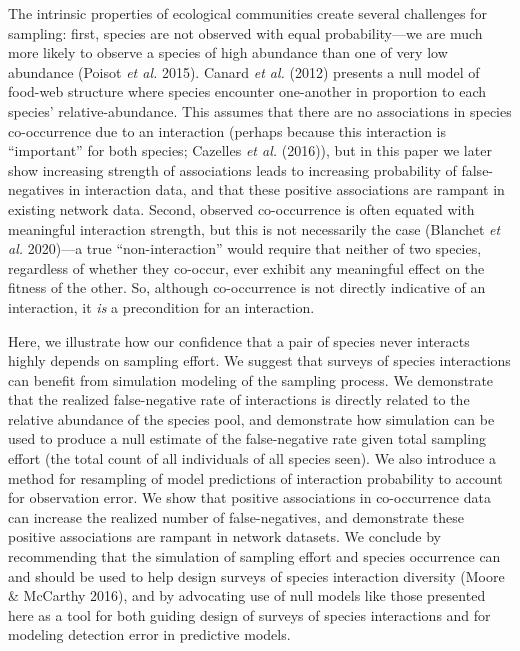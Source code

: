 \documentclass[11pt]{article}
\begin{document}
The intrinsic properties of ecological communities create several
challenges for sampling: first, species are not observed with equal
probability---we are much more likely to observe a species of high
abundance than one of very low abundance (Poisot \emph{et al.} 2015).
Canard \emph{et al.} (2012) presents a null model of food-web structure
where species encounter one-another in proportion to each species'
relative-abundance. This assumes that there are no associations in
species co-occurrence due to an interaction (perhaps because this
interaction is ``important'' for both species; Cazelles \emph{et al.}
(2016)), but in this paper we later show increasing strength of
associations leads to increasing probability of false-negatives in
interaction data, and that these positive associations are rampant in
existing network data. Second, observed co-occurrence is often equated
with meaningful interaction strength, but this is not necessarily the
case (Blanchet \emph{et al.} 2020)---a true ``non-interaction'' would
require that neither of two species, regardless of whether they
co-occur, ever exhibit any meaningful effect on the fitness of the
other. So, although co-occurrence is not directly indicative of an
interaction, it \emph{is} a precondition for an interaction.

Here, we illustrate how our confidence that a pair of species never
interacts highly depends on sampling effort. We suggest that surveys of
species interactions can benefit from simulation modeling of the
sampling process. We demonstrate that the realized false-negative rate
of interactions is directly related to the relative abundance of the
species pool, and demonstrate how simulation can be used to produce a
null estimate of the false-negative rate given total sampling effort
(the total count of all individuals of all species seen). We also
introduce a method for resampling of model predictions of interaction
probability to account for observation error. We show that positive
associations in co-occurrence data can increase the realized number of
false-negatives, and demonstrate these positive associations are rampant
in network datasets. We conclude by recommending that the simulation of
sampling effort and species occurrence can and should be used to help
design surveys of species interaction diversity (Moore \& McCarthy
2016), and by advocating use of null models like those presented here as
a tool for both guiding design of surveys of species interactions and
for modeling detection error in predictive models.
\end{document}
